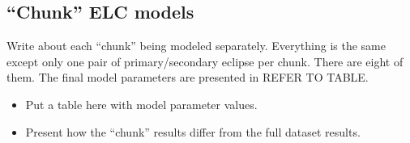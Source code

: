 \subsection{``Chunk'' ELC models}
Write about each ``chunk'' being modeled separately. Everything is the same except only one pair of primary/secondary eclipse per chunk. There are eight of them. The final model parameters are presented in REFER TO TABLE.

\begin{itemize}
\item Put a table here with model parameter values.
\item Present how the ``chunk'' results differ from the full dataset results.
\end{itemize}